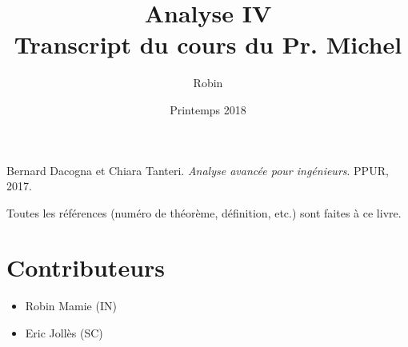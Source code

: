\documentclass[a4paper, 11pt]{report}
\title{\textbf{Analyse IV} \\
Transcript du cours du Pr. Michel \bsc{Cibils}}
\author{Robin \bsc{Mamié}}
\date{Printemps 2018}
\theoremstyle{definition}
\theoremstyle{remark}
\begin{document}
\maketitle

\tableofcontents




\begin{thebibliography}{9}
    Bernard Dacogna et Chiara Tanteri. 
    \textit{Analyse avancée pour ingénieurs}. 
    PPUR, 2017.
\end{thebibliography}

Toutes les références (numéro de théorème, définition, etc.) sont faites à ce livre.

\section*{Contributeurs}

\begin{itemize}
    \item Robin Mamie (IN)
    \item Eric Jollès (SC)
\end{itemize}
\end{document}
